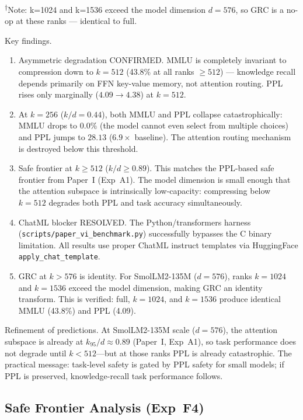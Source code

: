 \documentclass[11pt]{article}
\begin{document}
\smallskip
\noindent\textsuperscript{$\dagger$}Note: k=1024 and k=1536 exceed the model
dimension $d{=}576$, so GRC is a no-op at these ranks — identical to full.

Key findings.
\begin{enumerate}
\item Asymmetric degradation CONFIRMED.  MMLU is completely invariant
      to compression down to $k{=}512$ (43.8\% at all ranks ${\ge}512$) ---
      knowledge recall depends primarily on FFN key-value memory, not
      attention routing.  PPL rises only marginally ($4.09{\to}4.38$)
      at $k{=}512$.
\item At $k{=}256$ ($k/d{=}0.44$), both MMLU and PPL collapse
      catastrophically: MMLU drops to $0.0\%$ (the model cannot even
      select from multiple choices) and PPL jumps to $28.13$ ($6.9\times$
      baseline).  The attention routing mechanism is destroyed below
      this threshold.
\item Safe frontier at $k{\ge}512$ ($k/d{\ge}0.89$).  This matches
      the PPL-based safe frontier from Paper~I (Exp~A1).  The model
      dimension is small enough that the attention subspace is
      intrinsically low-capacity: compressing below $k{=}512$ degrades
      both PPL and task accuracy simultaneously.
\item ChatML blocker RESOLVED.  The Python/transformers harness
      (\texttt{scripts/paper\_vi\_benchmark.py}) successfully bypasses
      the C binary limitation.  All results use proper ChatML instruct
      templates via HuggingFace \texttt{apply\_chat\_template}.
\item GRC at $k{>}576$ is identity.  For SmolLM2-135M ($d{=}576$),
      ranks $k{=}1024$ and $k{=}1536$ exceed the model dimension,
      making GRC an identity transform.  This is verified: full,
      $k{=}1024$, and $k{=}1536$ produce identical MMLU (43.8\%)
      and PPL (4.09).
\end{enumerate}

Refinement of predictions.  At SmolLM2-135M scale ($d{=}576$),
the attention subspace is already at $k_{95}/d{\approx}0.89$ (Paper~I,
Exp~A1), so task performance does not degrade until $k{<}512$---but at
those ranks PPL is already catastrophic.  The practical message:
task-level safety is gated by PPL safety for small models; if PPL is
preserved, knowledge-recall task performance follows.

\subsection{Safe Frontier Analysis (Exp~F4)}
\end{document}
